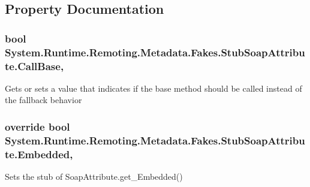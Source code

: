 \subsection{Property Documentation}
\hypertarget{class_system_1_1_runtime_1_1_remoting_1_1_metadata_1_1_fakes_1_1_stub_soap_attribute_a6670a58a9fcbe92ee37f577c959c0693}{
\subsubsection[{Call\-Base}]{\setlength{\rightskip}{0pt plus 5cm}bool System.\-Runtime.\-Remoting.\-Metadata.\-Fakes.\-Stub\-Soap\-Attribute.\-Call\-Base\hspace{0.3cm}{\ttfamily [get]}, {\ttfamily [set]}}}\label{class_system_1_1_runtime_1_1_remoting_1_1_metadata_1_1_fakes_1_1_stub_soap_attribute_a6670a58a9fcbe92ee37f577c959c0693}


Gets or sets a value that indicates if the base method should be called instead of the fallback behavior

\hypertarget{class_system_1_1_runtime_1_1_remoting_1_1_metadata_1_1_fakes_1_1_stub_soap_attribute_ac1ad6efb0bf0afc5165a3341b8d89709}{
\subsubsection[{Embedded}]{\setlength{\rightskip}{0pt plus 5cm}override bool System.\-Runtime.\-Remoting.\-Metadata.\-Fakes.\-Stub\-Soap\-Attribute.\-Embedded\hspace{0.3cm}{\ttfamily [get]}, {\ttfamily [set]}}}\label{class_system_1_1_runtime_1_1_remoting_1_1_metadata_1_1_fakes_1_1_stub_soap_attribute_ac1ad6efb0bf0afc5165a3341b8d89709}


Sets the stub of Soap\-Attribute.\-get\-\_\-\-Embedded()

